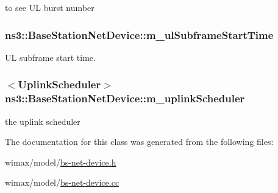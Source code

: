 to see UL burst number 

\subsubsection[{\texorpdfstring{m\+\_\+ul\+Subframe\+Start\+Time}{m_ulSubframeStartTime}}]{ ns3\+::\+Base\+Station\+Net\+Device\+::m\+\_\+ul\+Subframe\+Start\+Time\hspace{0.3cm}{\ttfamily [private]}}\hypertarget{classns3_1_1BaseStationNetDevice_a2053e58ada689af75ffd4d8fd4ca97fb}{}\label{classns3_1_1BaseStationNetDevice_a2053e58ada689af75ffd4d8fd4ca97fb}


UL subframe start time. 

\subsubsection[{\texorpdfstring{m\+\_\+uplink\+Scheduler}{m_uplinkScheduler}}]{$<${\bf Uplink\+Scheduler}$>$ ns3\+::\+Base\+Station\+Net\+Device\+::m\+\_\+uplink\+Scheduler\hspace{0.3cm}{\ttfamily [private]}}\hypertarget{classns3_1_1BaseStationNetDevice_a14803d3fbd21b8777a8c7c7aeef8b8ba}{}\label{classns3_1_1BaseStationNetDevice_a14803d3fbd21b8777a8c7c7aeef8b8ba}


the uplink scheduler 



The documentation for this class was generated from the following files\+:\begin{DoxyCompactItemize}
\item 
wimax/model/\hyperlink{bs-net-device_8h}{bs-\/net-\/device.\+h}\item 
wimax/model/\hyperlink{bs-net-device_8cc}{bs-\/net-\/device.\+cc}\end{DoxyCompactItemize}
